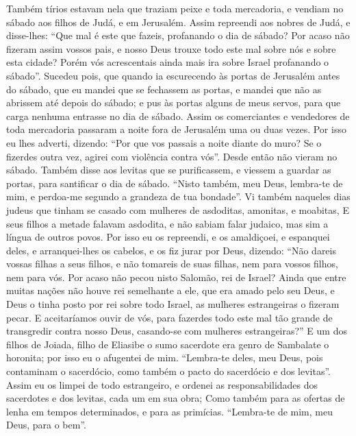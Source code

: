 {{  Também tírios estavam nela que traziam peixe e toda mercadoria, e vendiam no sábado aos filhos de Judá, e em Jerusalém.
  Assim repreendi aos nobres de Judá, e disse-lhes: \enquote{Que mal é este que fazeis, profanando o dia de sábado?
  Por acaso não fizeram assim vossos pais, e nosso Deus trouxe todo este mal sobre nós e sobre esta cidade? Porém vós acrescentais ainda mais ira sobre Israel profanando o sábado}.
  Sucedeu pois, que quando ia escurecendo às portas de Jerusalém antes do sábado, que eu mandei que se fechassem as portas, e mandei que não as abrissem até depois do sábado; e pus às portas alguns de meus servos, para que carga nenhuma entrasse no dia de sábado. %
  Assim os comerciantes e vendedores de toda mercadoria passaram a noite fora de Jerusalém uma ou duas vezes.
  Por isso eu lhes adverti, dizendo: \enquote{Por que vos passais a noite diante do muro? Se o fizerdes outra vez, agirei com violência contra vós}. Desde então não vieram no sábado.
  Também disse aos levitas que se purificassem, e viessem a guardar as portas, para santificar o dia de sábado. \enquote{Nisto também, meu Deus, lembra-te de mim, e perdoa-me segundo a grandeza de tua bondade}.
  Vi também naqueles dias judeus que tinham se casado com mulheres de asdoditas, amonitas, e moabitas,
  E seus filhos a metade falavam asdodita, e não sabiam falar judaico, mas sim a língua de outros povos.
  Por isso eu os repreendi, e os amaldiçoei, e espanquei {} deles, e arranquei-lhes os cabelos, e os fiz jurar por Deus, dizendo: \enquote{Não dareis vossas filhas a seus filhos, e não tomareis de suas filhas, nem para vossos filhos, nem para vós.
  Por acaso não pecou nisto Salomão, rei de Israel? Ainda que entre muitas nações não houve rei semelhante a ele, que era amado pelo seu Deus, e Deus o tinha posto por rei sobre todo Israel, {} as mulheres estrangeiras o fizeram pecar.
  E aceitaríamos ouvir de vós, para fazerdes todo este mal tão grande de transgredir contra nosso Deus, casando-se com mulheres estrangeiras?}
  E um dos filhos de Joiada, filho de Eliasibe o sumo sacerdote era genro de Sambalate o horonita; por isso eu o afugentei de mim.
  \enquote{Lembra-te deles, meu Deus, pois contaminam o sacerdócio, como também o pacto do sacerdócio e dos levitas}.
  Assim eu os limpei de todo estrangeiro, e ordenei as responsabilidades dos sacerdotes e dos levitas, cada um em sua obra;
  Como também para as ofertas de lenha em tempos determinados, e para as primícias. \enquote{Lembra-te de mim, meu Deus, para o bem}.}
\par }

